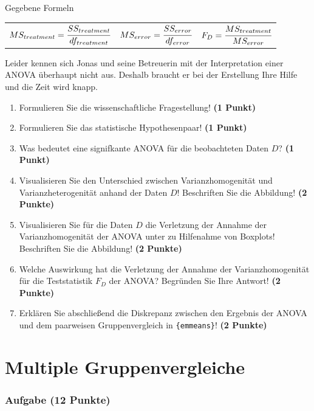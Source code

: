 \documentclass[a4paper, 9pt]{scrartcl}\usepackage[]{graphicx}\usepackage[]{xcolor}
\begin{document}
\begin{graybox}{Gegebene Formeln}
\begin{center}
  \begin{tabular}{ccc}
    $MS_{treatment} = \cfrac{SS_{treatment}}{df_{treatment}}$ &
    $MS_{error} = \cfrac{SS_{error}}{df_{error}}$ &
    $F_{D} = \cfrac{MS_{treatment}}{MS_{error}}$ \\
  \end{tabular}
\end{center}
\end{graybox}

Leider kennen sich Jonas und seine Betreuerin mit der Interpretation einer ANOVA überhaupt nicht aus. Deshalb braucht er bei der Erstellung Ihre Hilfe und die Zeit wird knapp. 

\begin{enumerate}
  \item Formulieren Sie die wissenschaftliche Fragestellung! \textbf{(1 Punkt)}
  \item Formulieren Sie das statistische Hypothesenpaar! \textbf{(1 Punkt)}
\item Was bedeutet eine signifkante ANOVA für die beobachteten Daten $D$? \textbf{(1 Punkt)}
\item Visualisieren Sie den Unterschied zwischen Varianzhomogenität und Varianzheterogenität anhand der Daten $D$! Beschriften Sie die Abbildung! \textbf{(2 Punkte)} 
\item Visualisieren Sie für die Daten $D$ die Verletzung der Annahme der Varianzhomogenität der ANOVA unter zu Hilfenahme von Boxplots! Beschriften Sie die Abbildung! \textbf{(2 Punkte)}
\item Welche Auswirkung hat die Verletzung der Annahme der Varianzhomogenität für die Teststatistik $F_D$ der ANOVA? Begründen Sie Ihre Antwort! \textbf{(2 Punkte)}
\item Erklären Sie abschließend die Diskrepanz zwischen den Ergebnis der ANOVA und dem paarweisen Gruppenvergleich in \texttt{\{emmeans\}}! \textbf{(2 Punkte)}
\end{enumerate}

 
\clearpage
\part{Multiple Gruppenvergleiche}

\section{Aufgabe \hfill (12 Punkte)}
\end{document}
